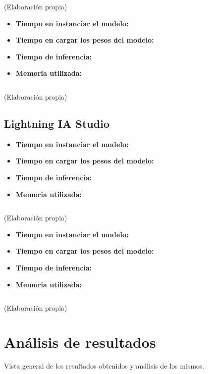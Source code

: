 \begin{mycode}
    \begin{verbatim}

    \end{verbatim}
    \caption[]{ (Elaboración propia)}
    \label{code:}
\end{mycode}

\begin{itemize}
    \item \textbf{Tiempo en instanciar el modelo:}
    \item \textbf{Tiempo en cargar los pesos del modelo:}
    \item \textbf{Tiempo de inferencia:}
    \item \textbf{Memoria utilizada:}
\end{itemize}

\begin{mycode}
    \begin{verbatim}

    \end{verbatim}
    \caption[]{ (Elaboración propia)}
    \label{code:}
\end{mycode}

\subsection{Lightning IA Studio}
\label{subsec:lightning_ia_studio}

\begin{itemize}
    \item \textbf{Tiempo en instanciar el modelo:}
    \item \textbf{Tiempo en cargar los pesos del modelo:}
    \item \textbf{Tiempo de inferencia:}
    \item \textbf{Memoria utilizada:}
\end{itemize}

\begin{mycode}
    \begin{verbatim}

    \end{verbatim}
    \caption[]{ (Elaboración propia)}
    \label{code:}
\end{mycode}

\begin{itemize}
    \item \textbf{Tiempo en instanciar el modelo:}
    \item \textbf{Tiempo en cargar los pesos del modelo:}
    \item \textbf{Tiempo de inferencia:}
    \item \textbf{Memoria utilizada:}
\end{itemize}

\begin{mycode}
    \begin{verbatim}

    \end{verbatim}
    \caption[]{ (Elaboración propia)}
    \label{code:}
\end{mycode}

\section{Análisis de resultados}
\label{sec:analisis_resultados}

Vista general de los resultados obtenidos y análisis de los mismos.